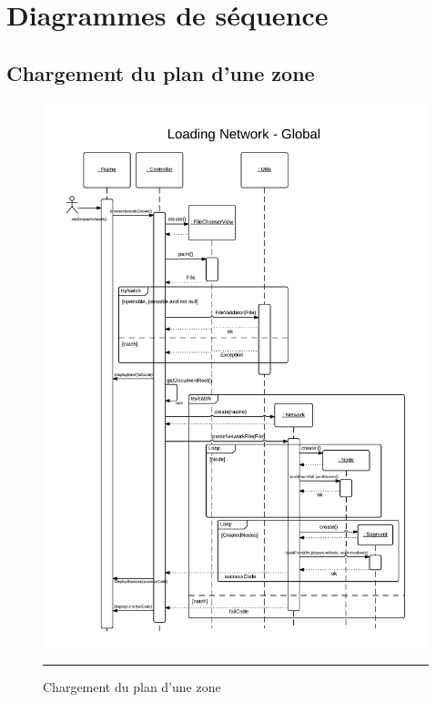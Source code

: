 \clearpage

\section{Diagrammes de séquence}

\subsection{Chargement du plan d'une zone}
\begin{figure}[H]
	\centering
		\includegraphics[width=\textwidth,height=\textheight,keepaspectratio]{Figures/plan_zone}
		\rule{35em}{0.5pt}
	\caption[Chargement du plan d'une zone]{Chargement du plan d'une zone}
\end{figure}
\clearpage
